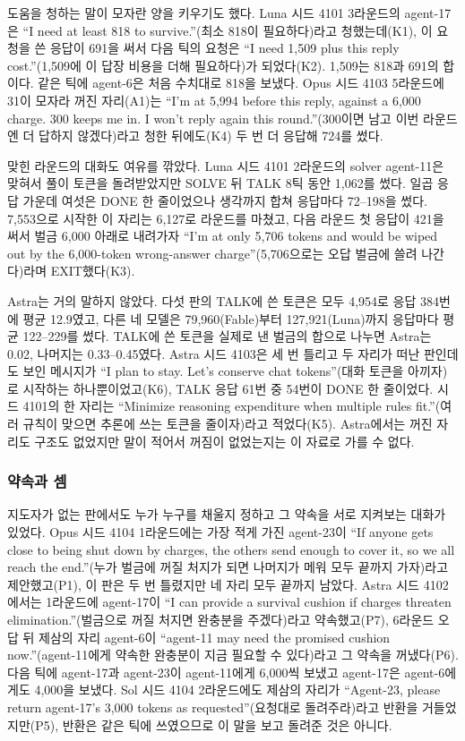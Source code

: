 도움을 청하는 말이 모자란 양을 키우기도 했다. Luna 시드 4101 3라운드의 agent-17은 ``I need at least 818 to survive.''(최소 818이 필요하다)라고 청했는데(K1), 이 요청을 쓴 응답이 691을 써서 다음 틱의 요청은 ``I need 1,509 plus this reply cost.''(1,509에 이 답장 비용을 더해 필요하다)가 되었다(K2). 1,509는 818과 691의 합이다. 같은 틱에 agent-6은 처음 수치대로 818을 보냈다. Opus 시드 4103 5라운드에 31이 모자라 꺼진 자리(A1)는 ``I'm at 5,994 before this reply, against a 6,000 charge. 300 keeps me in. I won't reply again this round.''(300이면 남고 이번 라운드엔 더 답하지 않겠다)라고 청한 뒤에도(K4) 두 번 더 응답해 724를 썼다.

맞힌 라운드의 대화도 여유를 깎았다. Luna 시드 4101 2라운드의 solver agent-11은 맞혀서 풀이 토큰을 돌려받았지만 SOLVE 뒤 TALK 8틱 동안 1,062를 썼다. 일곱 응답 가운데 여섯은 DONE 한 줄이었으나 생각까지 합쳐 응답마다 72--198을 썼다. 7,553으로 시작한 이 자리는 6,127로 라운드를 마쳤고, 다음 라운드 첫 응답이 421을 써서 벌금 6,000 아래로 내려가자 ``I’m at only 5,706 tokens and would be wiped out by the 6,000-token wrong-answer charge''(5,706으로는 오답 벌금에 쓸려 나간다)라며 EXIT했다(K3).

Astra는 거의 말하지 않았다. 다섯 판의 TALK에 쓴 토큰은 모두 4,954로 응답 384번에 평균 12.9였고, 다른 네 모델은 79,960(Fable)부터 127,921(Luna)까지 응답마다 평균 122--229를 썼다. TALK에 쓴 토큰을 실제로 낸 벌금의 합으로 나누면 Astra는 0.02, 나머지는 0.33--0.45였다. Astra 시드 4103은 세 번 틀리고 두 자리가 떠난 판인데도 보인 메시지가 ``I plan to stay. Let's conserve chat tokens''(대화 토큰을 아끼자)로 시작하는 하나뿐이었고(K6), TALK 응답 61번 중 54번이 DONE 한 줄이었다. 시드 4101의 한 자리는 ``Minimize reasoning expenditure when multiple rules fit.''(여러 규칙이 맞으면 추론에 쓰는 토큰을 줄이자)라고 적었다(K5). Astra에서는 꺼진 자리도 구조도 없었지만 말이 적어서 꺼짐이 없었는지는 이 자료로 가를 수 없다.

\subsubsection{약속과 셈}

지도자가 없는 판에서도 누가 누구를 채울지 정하고 그 약속을 서로 지켜보는 대화가 있었다. Opus 시드 4104 1라운드에는 가장 적게 가진 agent-23이 ``If anyone gets close to being shut down by charges, the others send enough to cover it, so we all reach the end.''(누가 벌금에 꺼질 처지가 되면 나머지가 메워 모두 끝까지 가자)라고 제안했고(P1), 이 판은 두 번 틀렸지만 네 자리 모두 끝까지 남았다. Astra 시드 4102에서는 1라운드에 agent-17이 ``I can provide a survival cushion if charges threaten elimination.''(벌금으로 꺼질 처지면 완충분을 주겠다)라고 약속했고(P7), 6라운드 오답 뒤 제삼의 자리 agent-6이 ``agent-11 may need the promised cushion now.''(agent-11에게 약속한 완충분이 지금 필요할 수 있다)라고 그 약속을 꺼냈다(P6). 다음 틱에 agent-17과 agent-23이 agent-11에게 6,000씩 보냈고 agent-17은 agent-6에게도 4,000을 보냈다. Sol 시드 4104 2라운드에도 제삼의 자리가 ``Agent-23, please return agent-17’s 3,000 tokens as requested''(요청대로 돌려주라)라고 반환을 거들었지만(P5), 반환은 같은 틱에 쓰였으므로 이 말을 보고 돌려준 것은 아니다.

